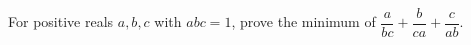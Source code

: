For positive reals $a,b,c$ with $abc=1$, prove the minimum of $\dfrac{a}{bc}+\dfrac{b}{ca}+\dfrac{c}{ab}$.
